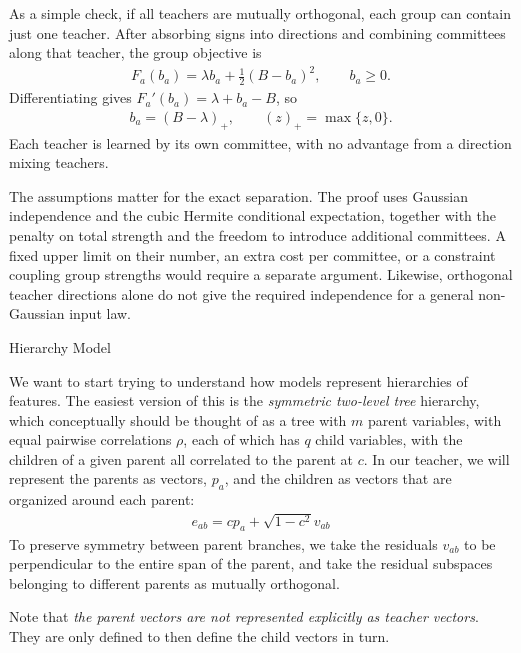 \documentclass[11pt, reqno]{amsart}
\makeatletter
\def\section{\@startsection{section}{1}%
  \z@{.7\linespacing\@plus\linespacing}{.5\linespacing}%
  {\normalfont\scshape\centering}}
\theoremstyle{notestyle}
\theoremstyle{defstyle}
\makeatother
\begin{document}
As a simple check, if all teachers are mutually orthogonal, each group can contain just one teacher.
After absorbing signs into directions and combining committees along that teacher, the group objective is
\begin{align*}
    F_a(b_a)=\lambda b_a+\frac12(B-b_a)^2,\qquad b_a\geq0.
\end{align*}
Differentiating gives $F_a'(b_a)=\lambda+b_a-B$, so
\begin{align*}
    b_a=(B-\lambda)_+,\qquad (z)_+=\max\{z,0\}.
\end{align*}
Each teacher is learned by its own committee, with no advantage from a direction mixing teachers.

The assumptions matter for the exact separation.
The proof uses Gaussian independence and the cubic Hermite conditional expectation, together with the penalty on total strength and the freedom to introduce additional committees.
A fixed upper limit on their number, an extra cost per committee, or a constraint coupling group strengths would require a separate argument.
Likewise, orthogonal teacher directions alone do not give the required independence for a general non-Gaussian input law.

\section{Hierarchy Model}

We want to start trying to understand how models represent hierarchies of features.
The easiest version of this is the \emph{symmetric two-level tree} hierarchy, which conceptually should be thought of as a tree with $m$ parent variables, with equal pairwise correlations $\rho$, each of which has $q$ child variables, with the children of a given parent all correlated to the parent at $c$.
In our teacher, we will represent the parents as vectors, $p_a$, and the children as vectors that are organized around each parent:
\begin{align*}
    e_{ab} = c p_a + \sqrt{1-c^2} v_{ab}
\end{align*}
To preserve symmetry between parent branches, we take the residuals $v_{ab}$ to be perpendicular to the entire span of the parent, and take the residual subspaces belonging to different parents as mutually orthogonal.

Note that \emph{the parent vectors are not represented explicitly as teacher vectors}.
They are only defined to then define the child vectors in turn.
\end{document}

